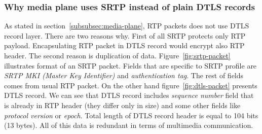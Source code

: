 \subsubsection{Why media plane uses SRTP instead of plain DTLS records}
As stated in section~\ref{subsubsec:media-plane}, RTP packets does not use DTLS record layer.
There are two reasons why.
First of all SRTP protects only RTP payload.
Encapsulating RTP packet in DTLS record would encrypt also RTP header.
The second reason is duplication of data.
Figure~\ref{fig:srtp-packet} illustrates format of an SRTP packet.
Fields that are specific to SRTP profile are \textit{SRTP MKI (Master Key Identifier)} and \textit{authentication tag}.
The rest of fields comes from usual RTP packet.
On the other hand figure~\ref{fig:dtls-packet} presents DTLS record.
We can see that DTLS record includes \textit{sequence number} field that is already in RTP header (they differ only in size) and some other fields like \textit{protocol version} or \textit{epoch}.
Total length of DTLS record header is equal to 104 bits (13 bytes).
All of this data is redundant in terms of multimedia communication.

